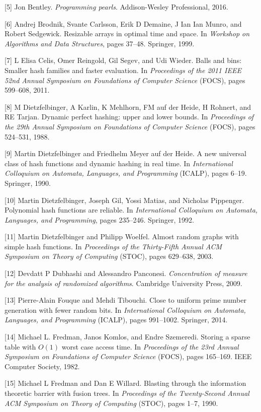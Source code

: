 \documentclass[12pt,a4paper]{ctexart}
\theoremstyle{remark}
\begin{document}
[5] Jon Bentley. \textit{Programming pearls}. Addison-Wesley Professional, 2016.

[6] Andrej Brodnik, Svante Carlsson, Erik D Demaine, J Ian Ian Munro, and Robert Sedgewick. Resizable arrays in optimal time and space. In \textit{Workshop on Algorithms and Data Structures}, pages 37--48. Springer, 1999.

[7] L Elisa Celis, Omer Reingold, Gil Segev, and Udi Wieder. Balls and bins: Smaller hash families and faster evaluation. In \textit{Proceedings of the 2011 IEEE 52nd Annual Symposium on Foundations of Computer Science} (FOCS), pages 599--608, 2011.

[8] M Dietzfelbinger, A Karlin, K Mehlhorn, FM auf der Heide, H Rohnert, and RE Tarjan. Dynamic perfect hashing: upper and lower bounds. In \textit{Proceedings of the 29th Annual Symposium on Foundations of Computer Science} (FOCS), pages 524--531, 1988.

[9] Martin Dietzfelbinger and Friedhelm Meyer auf der Heide. A new universal class of hash functions and dynamic hashing in real time. In \textit{International Colloquium on Automata, Languages, and Programming} (ICALP), pages 6--19. Springer, 1990.

[10] Martin Dietzfelbinger, Joseph Gil, Yossi Matias, and Nicholas Pippenger. Polynomial hash functions are reliable. In \textit{International Colloquium on Automata, Languages, and Programming}, pages 235--246. Springer, 1992.

[11] Martin Dietzfelbinger and Philipp Woelfel. Almost random graphs with simple hash functions. In \textit{Proceedings of the Thirty-Fifth Annual ACM Symposium on Theory of Computing} (STOC), pages 629--638, 2003.

[12] Devdatt P Dubhashi and Alessandro Panconesi. \textit{Concentration of measure for the analysis of randomized algorithms}. Cambridge University Press, 2009.

[13] Pierre-Alain Fouque and Mehdi Tibouchi. Close to uniform prime number generation with fewer random bits. In \textit{International Colloquium on Automata, Languages, and Programming} (ICALP), pages 991--1002. Springer, 2014.

[14] Michael L. Fredman, Janos Komlos, and Endre Szemeredi. Storing a sparse table with $O(1)$ worst case access time. In \textit{Proceedings of the 23rd Annual Symposium on Foundations of Computer Science} (FOCS), pages 165--169. IEEE Computer Society, 1982.

[15] Michael L Fredman and Dan E Willard. Blasting through the information theoretic barrier with fusion trees. In \textit{Proceedings of the Twenty-Second Annual ACM Symposium on Theory of Computing} (STOC), pages 1--7, 1990.
\end{document}
